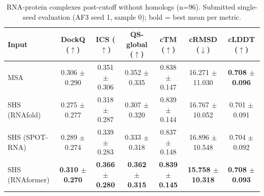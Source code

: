 \begin{table}[htbp]
\centering
\caption{RNA-protein complexes post-cutoff without homologs (n=96). Submitted single-seed evaluation (AF3 seed 1, sample 0); bold = best mean per metric.}
\label{tab:rna_protein_complexes_post_cutoff_without_homologs}
\begin{tabular}{lcccccc}
\toprule
Input & DockQ ($\uparrow$) & ICS ($\uparrow$) & QS-global ($\uparrow$) & cTM ($\uparrow$) & cRMSD ($\downarrow$) & cLDDT ($\uparrow$) \\
\midrule
MSA & 0.306 $\pm$ 0.290 & 0.351 $\pm$ 0.306 & 0.352 $\pm$ 0.335 & 0.838 $\pm$ 0.147 & 16.271 $\pm$ 11.030 & \textbf{0.708 $\pm$ 0.096} \\
SHS (RNAfold) & 0.275 $\pm$ 0.277 & 0.318 $\pm$ 0.287 & 0.307 $\pm$ 0.320 & 0.839 $\pm$ 0.144 & 16.767 $\pm$ 10.052 & 0.701 $\pm$ 0.091 \\
SHS (SPOT-RNA) & 0.289 $\pm$ 0.274 & 0.339 $\pm$ 0.283 & 0.333 $\pm$ 0.318 & 0.837 $\pm$ 0.148 & 16.896 $\pm$ 10.548 & 0.704 $\pm$ 0.092 \\
SHS (RNAformer) & \textbf{0.310 $\pm$ 0.270} & \textbf{0.366 $\pm$ 0.280} & \textbf{0.362 $\pm$ 0.315} & \textbf{0.839 $\pm$ 0.145} & \textbf{15.758 $\pm$ 10.318} & \textbf{0.708 $\pm$ 0.093} \\
\bottomrule
\end{tabular}
\end{table}
